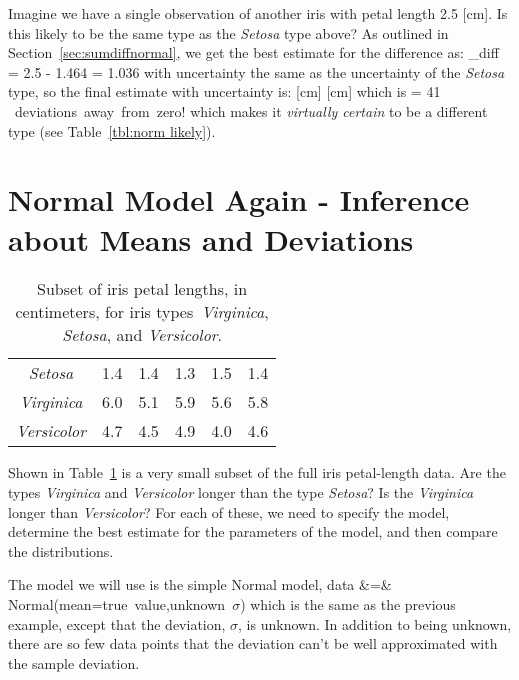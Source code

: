 
Imagine we have a single observation of another iris with petal length 2.5 [cm].  Is this likely to be the same type as the {\em Setosa} type above?    As outlined in Section~\ref{sec:sumdiffnormal}, we get the best estimate for the difference as:
\beqn
\mu_{\rm diff} = 2.5 - 1.464 = 1.036
\eeqn
with uncertainty the same as the uncertainty of the {\em Setosa} type, so the final estimate with uncertainty is:
 [{\rm cm}]  [{\rm cm}]
\eeqn
which is 
\beqn
{} = 41 \mbox{ deviations away from zero!}
\eeqn
which makes it \emph{virtually certain} to be a different type (see Table~\ref{tbl:norm likely}).


\section{Normal Model Again - Inference about Means and Deviations}

\begin{table}
\begin{center}
\begin{tabular}{cccccc}
\toprule
{\it Setosa} &1.4& 1.4& 1.3& 1.5& 1.4\\
{\it Virginica} & 6.0& 5.1& 5.9& 5.6& 5.8\\
{\it Versicolor} &4.7& 4.5& 4.9& 4.0& 4.6\\
\bottomrule
\end{tabular}
\end{center}
\label{tbl:iris_length2}
\caption{Subset of iris petal lengths, in centimeters, for iris types~\emph{Virginica}, \emph{Setosa}, and \emph{Versicolor}.}
\end{table}


Shown in Table~\ref{tbl:iris_length2} is a very small subset of the full iris petal-length data.  Are the types \emph{Virginica} and \emph{Versicolor} longer than the type \emph{Setosa}?  Is the \emph{Virginica} longer than \emph{Versicolor}?  For each of these, we need to specify the model, determine the best estimate for the parameters of the model, and then compare the distributions.

The model we will use is the simple Normal model, 
\beqn
{\rm data} &=& \mbox{Normal(mean=\mbox{true value},unknown $\sigma$)}
\eeqn
which is the same as the previous example, except that the deviation, $\sigma$, is unknown.  In addition to being unknown, there are so few data points that the deviation can't be well approximated with the sample deviation.  

